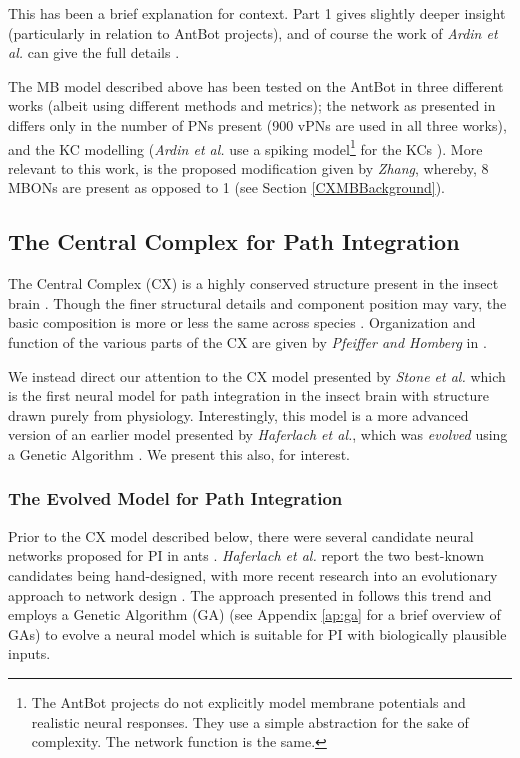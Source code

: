 \documentclass[a4paper,11pt,twoside,openright]{article}
\begin{document}
This has been a brief explanation for context. Part 1 gives slightly deeper
insight \cite{Mitchell2018} (particularly in relation to AntBot projects), and of
course the work of \textit{Ardin et al.} can give the full details
\cite{Ardin2016}.
\newline
\par

The MB model described above has been tested on the AntBot in three
different works (albeit using different methods and metrics); the
network as presented in \cite{Eberding2016, Zhang2017, Mitchell2018}
differs only in the number of PNs present (900 vPNs are used in all
three works), and the KC modelling (\textit{Ardin et al.} use a
spiking model\footnote{The AntBot projects do not explicitly model
  membrane potentials and realistic neural responses.  They use a
  simple abstraction for the sake of complexity. The network function
  is the same.} for the KCs \cite{Ardin2016}). More
relevant to this work, is the proposed modification given by
\textit{Zhang}, whereby, 8 MBONs are present as opposed to 1 (see
Section \ref{CXMBBackground}).
\newline
\par

\subsection{ The Central Complex for Path Integration } \label{CXBackground}
The Central Complex (CX) is a highly conserved structure present in the insect
brain \cite{Pfeiffer2014, Stone2017}. Though the finer structural details and
component position may vary, the basic composition is more or less the same
across species \cite{Pfeiffer2014}. Organization and function of the
various parts of the CX are given by \textit{Pfeiffer and Homberg} in
\cite{Pfeiffer2014}.
\newline
\par

We instead direct our attention to the CX model presented by
\textit{Stone et al.}  which is the first neural model for path
integration in the insect brain with structure drawn purely from
physiology. Interestingly, this model is a more advanced version of an
earlier model presented by \textit{Haferlach et al.}, which was
\textit{evolved} using a Genetic Algorithm \cite{Haferlach2007}. We
present this also, for interest.

\subsubsection{The Evolved Model for Path Integration}
Prior to the CX model described below, there were several candidate neural
networks proposed for PI in ants \cite{Haferlach2007}. \textit{Haferlach et al.}
report the
two best-known candidates being hand-designed, with more recent research
into an evolutionary approach to network design \cite{Haferlach2007}. The
approach presented in \cite{Haferlach2007} follows this trend and employs
a Genetic Algorithm (GA) (see Appendix \ref{ap:ga} for a brief
overview of GAs) to
evolve a neural model which is suitable for PI with biologically plausible
inputs.
\newline
\par
\end{document}
